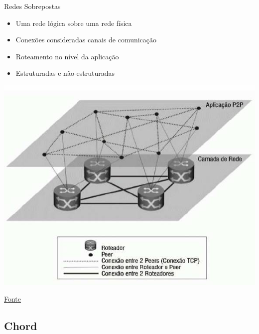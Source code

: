 \begin{frame}{Redes Sobrepostas}
\begin{itemize}
	\item Uma rede lógica sobre uma rede física
	\item Conexões consideradas canais de comunicação
	\item Roteamento no nível da aplicação
	\item Estruturadas e não-estruturadas	
\end{itemize}

\pause
\includegraphics[width=.5\textwidth]{images/overlay}

\href{https://content.iospress.com/media/jhs/2017/23-1/jhs-23-1-jhs558/jhs-23-jhs558-g002.jpg?width=755}{Fonte}

\end{frame}


\subsection{Chord}

